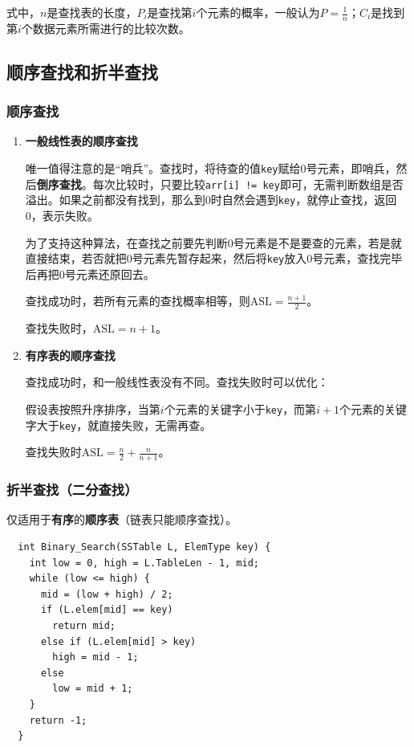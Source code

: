 \documentclass[12pt, a4paper, oneside]{ctexart}
\begin{document}
式中，$n$是查找表的长度，$P_i$是查找第$i$个元素的概率，一般认为$P=\frac{1}{n}$；$C_i$是找到第$i$个数据元素所需进行的比较次数。

\subsection{顺序查找和折半查找}

\subsubsection{顺序查找}

\begin{enumerate}
  \item {\bf 一般线性表的顺序查找}
  
  唯一值得注意的是“哨兵”。查找时，将待查的值\verb|key|赋给0号元素，即哨兵，然后\textbf{倒序查找}。每次比较时，只要比较\verb|arr[i] != key|即可，无需判断数组是否溢出。如果之前都没有找到，那么到0时自然会遇到\verb|key|，就停止查找，返回0，表示失败。

  为了支持这种算法，在查找之前要先判断0号元素是不是要查的元素，若是就直接结束，若否就把0号元素先暂存起来，然后将\verb|key|放入0号元素，查找完毕后再把0号元素还原回去。

  查找成功时，若所有元素的查找概率相等，则$\text{ASL}=\frac{n+1}{2}$。

  查找失败时，$\text{ASL}=n+1$。

  \item {\bf 有序表的顺序查找}
  
  查找成功时，和一般线性表没有不同。查找失败时可以优化：

  假设表按照升序排序，当第$i$个元素的关键字小于\verb|key|，而第$i+1$个元素的关键字大于\verb|key|，就直接失败，无需再查。

  查找失败时$\text{ASL}=\frac{n}{2}+\frac{n}{n+1}$。
\end{enumerate}

\subsubsection{折半查找（二分查找）}

仅适用于\textbf{有序}的\textbf{顺序表}（链表只能顺序查找）。

\begin{lstlisting}
  int Binary_Search(SSTable L, ElemType key) {
    int low = 0, high = L.TableLen - 1, mid;
    while (low <= high) {
      mid = (low + high) / 2;
      if (L.elem[mid] == key)
        return mid;
      else if (L.elem[mid] > key)
        high = mid - 1;
      else
        low = mid + 1;
    }
    return -1;
  }
\end{lstlisting}
\end{document}
